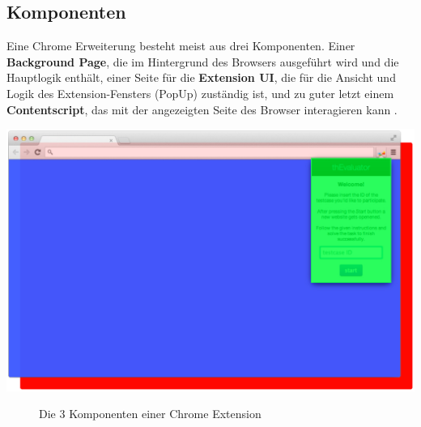 \subsection{Komponenten}

Eine Chrome Erweiterung besteht meist aus drei Komponenten. Einer \textbf{{\color{red}Background Page}}, die im Hintergrund des Browsers ausgeführt wird und die Hauptlogik enthält, einer Seite für die \textbf{{\color{green}Extension UI}}, die für die Ansicht und Logik des Extension-Fensters (PopUp) zuständig ist, und zu guter letzt einem \textbf{{\color{blue}Contentscript}}, das mit der angezeigten Seite des Browser interagieren kann \cite{extensionArchitecture}.

\begin{center}
\includegraphics[scale=0.34]{./images/layers}
\end{center}
\begin{figure}[htb]
    \centering
    \caption{Die 3 Komponenten einer Chrome Extension}
    \label{layers}
\end{figure}

